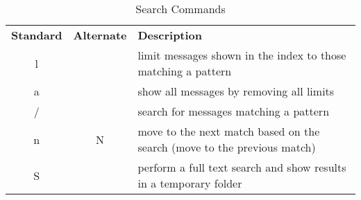 \documentclass{article}
\begin{document}
\begin{table*}[!b]
\renewcommand{\arraystretch}{1.3}
\caption{Search Commands}
\label{tab:search}
\footnotesize
\begin{tabulary}{\textwidth}{CCL}
  \textbf{Standard} & \textbf{Alternate} & \textbf{Description}\\
  l & & limit messages shown in the index to those matching a pattern\\
  a & & show all messages by removing all limits\\
  / & & search for messages matching a pattern\\
  n & N & move to the next match based on the search (move to the previous match)\\
  S & & perform a full text search and show results in a temporary folder\\
\end{tabulary}
\end{table*}
\end{document}
